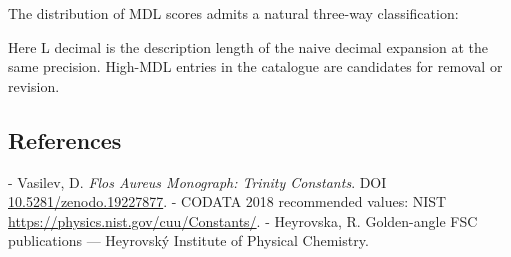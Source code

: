   The distribution of MDL scores admits a natural three-way classification:

  Here L decimal is the description length of the naive decimal expansion at the same
  precision. High-MDL entries in the catalogue are candidates for removal or revision.

\subsection{References}

- Vasilev, D. \textit{Flos Aureus Monograph: Trinity Constants}. DOI \href{https://zenodo.org/doi/10.5281/zenodo.19227877}{10.5281/zenodo.19227877}.
- CODATA 2018 recommended values: NIST \href{https://physics.nist.gov/cuu/Constants/}{https://physics.nist.gov/cuu/Constants/}.
- Heyrovska, R. Golden-angle FSC publications --- Heyrovský Institute of Physical Chemistry.
